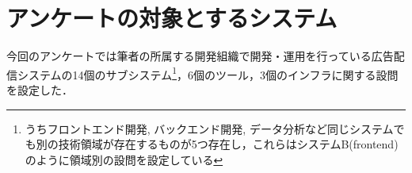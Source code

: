 \section{アンケートの対象とするシステム}
今回のアンケートでは筆者の所属する開発組織で開発・運用を行っている広告配信システムの14個のサブシステム\footnote{うちフロントエンド開発, バックエンド開発, データ分析など同じシステムでも別の技術領域が存在するものが5つ存在し，これらはシステムB(frontend)のように領域別の設問を設定している}，6個のツール，3個のインフラに関する設問を設定した．

